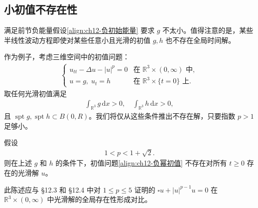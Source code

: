 \documentclass[../../main.tex]{subfiles}
\begin{document}
\subsection{小初值不存在性}\label{subsection:ch12-小初值不存在}

满足前节负能量假设\eqref{align:ch12-负初始能量} 要求 $g$ 不太小。值得注意的是，某些半线性波动方程即使对某些任意小且光滑的初值 $g,h$ 也不存在全局时间解。

作为例子，考虑三维空间中的初值问题：
\begin{align}
\begin{cases}
u_{tt}-\Delta u-|u|^p=0 & \text{在 } \mathbb{R}^3\times(0,\infty) \text{ 中},\\
u=g,\;u_t=h & \text{在 } \mathbb{R}^3\times\{t=0\} \text{ 上}.
\end{cases}
\label{align:ch12-负幂初值}
\end{align}
取任何光滑初值满足
\begin{align}
\int_{\mathbb{R}^3}g\,\mathrm{d}x>0,\quad\int_{\mathbb{R}^3}h\,\mathrm{d}x>0,
\label{align:ch12-初值正积分}
\end{align}
且 $\operatorname{spt}g,\operatorname{spt}h\subset B(0,R)$。我们将仅从这些条件推出不存在解，只要指数 $p>1$ 足够小。

\begin{theorem}[小数据不存在性。]\label{theorem:ch12-小数据不存在}假设
\begin{align*}
1<p<1+\sqrt{2}.
\end{align*}
则在上述 $g$ 和 $h$ 的条件下，初值问题\eqref{align:ch12-负幂初值} 不存在对所有 $t\geqslant 0$ 存在的光滑解 $u$。

此陈述应与 \S12.3 和 \S12.4 中对 $1\leqslant p\leqslant 5$ 证明的 $\square u+|u|^{p-1}u=0$ 在 $\mathbb{R}^3\times(0,\infty)$ 中光滑解的全局存在性形成对比。
\end{theorem}
\end{document}
